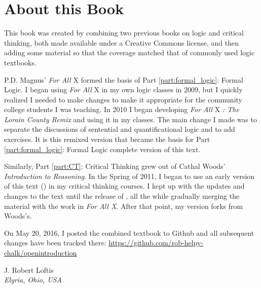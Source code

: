 
\setlength{\parindent}{1em}
\chapter{About this Book}

This book was created by combining two previous books on logic and critical thinking, both made available under a Creative Commons license, and then adding some material so that the 
coverage matched that of commonly used logic textbooks.

P.D. Magnus' \textit{For All} X \parencite*{Magnus2008} formed the basis of Part \ref{part:formal_logic}: Formal Logic. I began using \textit{For All} X in my own logic classes in 2009, 
but I quickly realized I needed to make changes to make it appropriate for the community college students I was teaching. In 2010 I began developing \textit{For All} X \textit{: The 
Lorain County Remix} and using it in my classes. The main change I made was to separate the discussions of sentential and quantificational logic and to add exercises. It is this remixed 
version that became the basis for Part \ref{part:formal_logic}: Formal Logic complete version of this text.

Similarly, Part \ref{part:CT}: Critical Thinking grew out of 
Cathal Woods' \textit{Introduction to Reasoning}. In the Spring of 2011, I began to use an early version of this text (\cite{Woods2011}) in my critical thinking courses. I kept up with 
the updates and changes to the text until the release of \cite{Woods2014}, all the while gradually merging the material with the work in \textit{For All X}. After that point, my version 
forks from Woods's.

On May 20, 2016, I posted the combined textbook to Github and all subsequent changes have been tracked there: \url{https://github.com/rob-helpy-chalk/openintroduction}



 \begin{adjustwidth}{2em}{0em} 
 J. Robert Loftis \\
\noindent \emph{Elyria, Ohio, USA} 
\end{adjustwidth}

